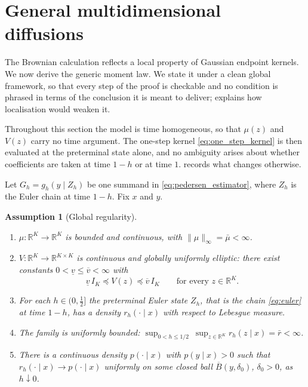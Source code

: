 \documentclass[11pt]{article}
\newtheorem{assumption}[assumption]{Assumption}
\theoremstyle{definition}
\newcommand{\R}{\mathbb{R}}
\begin{document}
\FloatBarrier
\section{General multidimensional diffusions}\label{sec:general}

The Brownian calculation reflects a local property of Gaussian endpoint kernels. We now derive the generic moment law. We state it under a clean global framework, so that every step of the proof is checkable and no condition is phrased in terms of the conclusion it is meant to deliver;  explains how localisation would weaken it.

Throughout this section the model is time homogeneous, so that $\mu(z)$ and $V(z)$ carry no time argument. The one-step kernel \eqref{eq:one_step_kernel} is then evaluated at the preterminal state alone, and no ambiguity arises about whether coefficients are taken at time $1-h$ or at time $1$.  records what changes otherwise.

Let $G_h=g_h(y\mid Z_h)$ be one summand in \eqref{eq:pedersen_estimator}, where $Z_h$ is the Euler chain at time $1-h$. Fix $x$ and $y$.

\begin{assumption}[Global regularity]\label{ass:local}
\begin{enumerate}[label=(A\arabic*)]
\item\label{ass:mu} $\mu:\R^K\to\R^K$ is bounded and continuous, with $\lVert\mu\rVert_\infty=\bar\mu<\infty$.
\item\label{ass:V} $V:\R^K\to\R^{K\times K}$ is continuous and globally uniformly elliptic: there exist constants $0<\underline v\le\overline v<\infty$ with
\begin{equation}\label{eq:uniform_ellipticity}
\underline v\,I_K\preceq V(z)\preceq\overline v\,I_K
\qquad\text{for every }z\in\R^K.
\end{equation}
\item\label{ass:rh} For each $h\in(0,\tfrac12]$ the preterminal Euler state $Z_h$, that is the chain \eqref{eq:euler} at time $1-h$, has a density $r_h(\cdot\mid x)$ with respect to Lebesgue measure.
\item\label{ass:bound} The family is uniformly bounded: $\sup_{0<h\le1/2}\ \sup_{z\in\R^K}r_h(z\mid x)=\bar r<\infty$.
\item\label{ass:conv} There is a continuous density $p(\cdot\mid x)$ with $p(y\mid x)>0$ such that $r_h(\cdot\mid x)\to p(\cdot\mid x)$ uniformly on some closed ball $\overline B(y,\delta_0)$, $\delta_0>0$, as $h\downarrow0$.
\end{enumerate}
\end{assumption}
\end{document}
